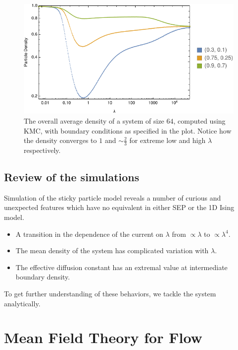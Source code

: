 \documentclass[
reprint, amsmath,amssymb,
]{revtex4-1}
\begin{document}
\begin{figure}[h!]
\vspace{0em}
\begin{center}
    \includegraphics[width=1\linewidth]{wideDensProfiles}
\end{center}
    \vspace{-0em}
\caption{\label{fig:wideDensities} The overall average density of a system of size $64$, computed using KMC, with boundary conditions as specified in the plot. Notice how the density converges to $1$ and $\sim \frac{2}{3}$
for extreme low and high $\lambda$ respectively.}
\end{figure}

\subsection{Review of the simulations}

Simulation of the sticky particle model reveals a number of curious
and unexpected features which have no equivalent in either SEP or the
1D Ising model.

\begin{itemize} \item 
A transition in the dependence of the current on $\lambda$ from $\propto \lambda$ to $\propto \lambda^4$.  
\item
The mean density of the system  has complicated variation with  $\lambda$.  
\item 
The effective diffusion constant has an extremal value at
  intermediate boundary density.
\end{itemize}

To get further understanding of these behaviors, we tackle the system
analytically.

\section{Mean Field Theory for Flow}
  
\end{document}
